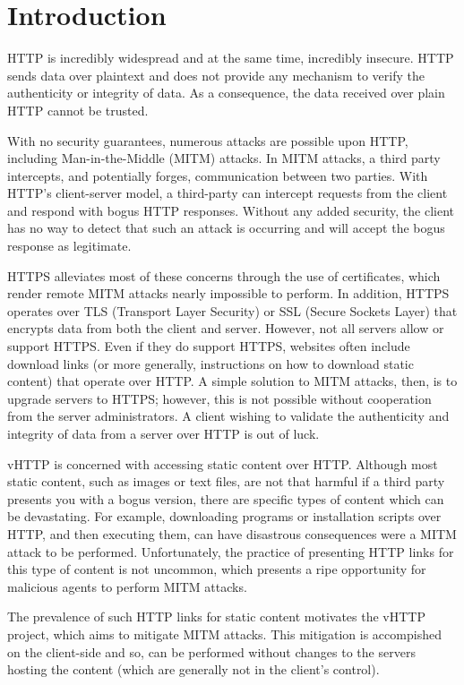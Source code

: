 \section{Introduction}
\label{sec:intro}

HTTP is incredibly widespread and at the same time, incredibly insecure. HTTP
sends data over plaintext and does not provide any mechanism to verify the
authenticity or integrity of data. As a consequence, the data received over
plain HTTP cannot be trusted.

With no security guarantees, numerous attacks are possible upon HTTP, including
Man-in-the-Middle (MITM) attacks. In MITM attacks, a third party intercepts,
and potentially forges, communication between two parties. With HTTP's
client-server model, a third-party can intercept requests from the client and
respond with bogus HTTP responses. Without any added security, the client has
no way to detect that such an attack is occurring and will accept the bogus
response as legitimate.

HTTPS alleviates most of these concerns through the use of certificates, which
render remote MITM attacks nearly impossible to perform. In addition, HTTPS
operates over TLS (Transport Layer Security) or SSL (Secure Sockets Layer) that
encrypts data from both the client and server. However, not all servers allow
or support HTTPS. Even if they do support HTTPS, websites often include
download links (or more generally, instructions on how to download static
content) that operate over HTTP. A simple solution to MITM attacks, then, is
to upgrade servers to HTTPS; however, this is not possible without cooperation
from the server administrators. A client wishing to validate the authenticity
and integrity of data from a server over HTTP is out of luck.

vHTTP is concerned with accessing static content over HTTP. Although most
static content, such as images or text files, are not that harmful if a third
party presents you with a bogus version, there are specific types of content
which can be devastating. For example, downloading programs or installation
scripts over HTTP, and then executing them, can have disastrous consequences
were a MITM attack to be performed. Unfortunately, the practice of presenting
HTTP links for this type of content is not uncommon, which presents a ripe
opportunity for malicious agents to perform MITM attacks.

The prevalence of such HTTP links for static content motivates the vHTTP
project, which aims to mitigate MITM attacks. This mitigation is accompished on
the client-side and so, can be performed without changes to the servers hosting
the content (which are generally not in the client's control).
